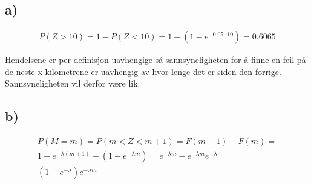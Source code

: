 \subsection*{a)}


\begin{gather*}
	P(Z > 10) = 1 - P(Z < 10) = 1 - \left(
		1 - e^{-0.05 \cdot 10}
	\right)
	=
	0.6065
\end{gather*}

Hendelsene er per definisjon uavhengige så sannsyneligheten for å finne en feil på de neste x kilometrene er uavhengig av hvor lenge det er siden den forrige. Sannsyneligheten vil derfor være lik.


\subsection*{b)}


\begin{gather*}
	P(M = m) = P(m < Z < m + 1) = F(m + 1) - F(m) =
	\\
	1 - e^{-\lambda (m + 1)} - \left(
		1 - e^{-\lambda m}
	\right) =
	e^{-\lambda m} - e^{-\lambda m} e^{-\lambda} =
	\\
	\left(
		1 - e^{-\lambda}
	\right) e^{-\lambda m}
\end{gather*}
